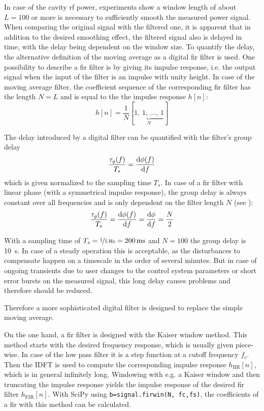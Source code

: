 In case of the cavity \gls{rf} power, experiments show a window length of about $L=100$ or more is necessary to sufficiently smooth the measured power signal.
When comparing the original signal with the filtered one, it is apparent that in addition to the desired smoothing effect, the filtered signal also is delayed in time, with the delay being dependent on the window size.
To quantify the delay, the alternative definition of the moving average as a digital \gls{fir} filter is used.
One possibility to describe a \gls{fir} filter is by giving its impulse response, i.e. the output signal when the input of the filter is an impulse with unity height. In case of the moving average filter, the coefficient sequence of the corresponding \gls{fir} filter has the length $N=L$ and is equal to the the impulse response $h[n]$:
\begin{equation}
h[n] = \frac{1}{N} [\underbrace{1,\,1,\,...,\,1}_N]
\end{equation}

The delay introduced by a digital filter can be quantified with the filter's group delay
\begin{equation}
\frac{\tau_g(f)}{T_s} = \frac{\text{d}{\phi(f)}}{\text{d}{f}}
\end{equation}
which is given normalized to the sampling time $T_s$. \cite[p.~70]{Kammeyer2002} In case of a \gls{fir} filter with linear phase (with a symmetrical impulse response), the group delay is always constant over all frequencies and is only dependent on the filter length $N$ (see \cite[p.~165]{Kammeyer2002}):
\begin{equation}\label{eq:groupD}
\frac{\tau_g(f)}{T_s} = \frac{\text{d}{\phi(f)}}{\text{d}{f}} = \frac{\text{d}{\phi}}{\text{d}{f}} = \frac{N}{2}
\end{equation}

With a sampling time of $T_s=\nicefrac{1}{\SI{5}{\hertz}}=\SI{200}{\milli\second}$ and $N=100$ the group delay is \SI{10}{\second}. In case of a steady operation this is acceptable, as the disturbances to compensate happen on a timescale in the order of several minutes.
But in case of ongoing transients due to user changes to the control system parameters or short error bursts on the measured signal, this long delay causes problems and therefore should be reduced.

Therefore a more sophisticated digital filter is designed to replace the simple moving average.

On the one hand, a \gls{fir} filter is designed with the Kaiser window method.
This method starts with the desired frequency response, which is usually given piece-wise. 
In case of the low pass filter it is a step function at a cutoff frequency $f_c$.
Then the IDFT is used to compute the corresponding impulse response $h_\text{IIR}[n]$, which is in general infinitely long.
Windowing with e.g. a Kaiser window and then truncating the impulse response yields the impulse response of the desired \gls{fir} filter $h_\text{FIR}[n]$. \cite[p.~533]{Oppenheim2010}
With SciPy using \texttt{b=signal.firwin(N, fc,fs)}, the coefficients of a \gls{fir} with this method can be calculated.

